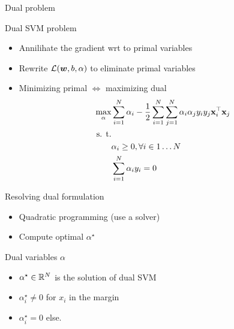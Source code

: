\documentclass[11pt, pdf, compress, handout]{beamer}
\begin{document}
\begin{frame}[allowframebreaks]{Dual problem}
  \begin{block}{Dual SVM problem}
    \begin{itemize}
    \item Annilihate the gradient wrt to primal variables
    \item Rewrite ${\mathcal{L}}({\boldsymbol{w}},b,\alpha)$ to eliminate primal variables
    \item Minimizing primal $\Leftrightarrow$ maximizing dual
      \begin{align*}
        \max_{\alpha} & \sum_{i=1}^N \alpha_i - \frac{1}{2} \sum_{i=1}^N
                        \sum_{j=1}^N \alpha_i \alpha_j y_i y_j {\mathbf{x}}_i^\top {\mathbf{x}}_j \\
        \text{s. t.}  & \\
                      &\alpha_i \geq 0 , \forall i \in 1 \dots N \\
                      & \sum_{i=1}^N \alpha_i y_i = 0\\
      \end{align*}
    \end{itemize}
  \end{block}
  
  \framebreak

  \begin{block}{Resolving dual formulation}
    \begin{itemize}
    \item Quadratic programming (use a solver)
    \item Compute optimal $\alpha^\star$
    \end{itemize}
  \end{block}
  
  \begin{block}{Dual variables $\alpha$}
    \begin{itemize}
    \item $\alpha^\star \in {\mathbb{R}}^N$ is the solution of dual SVM
    \item $\alpha_i^\star \neq 0$ for $x_i$ in the margin
    \item $\alpha_i^\star = 0$ else.
          \end{itemize}
  \end{block}
\end{frame}
\end{document}
